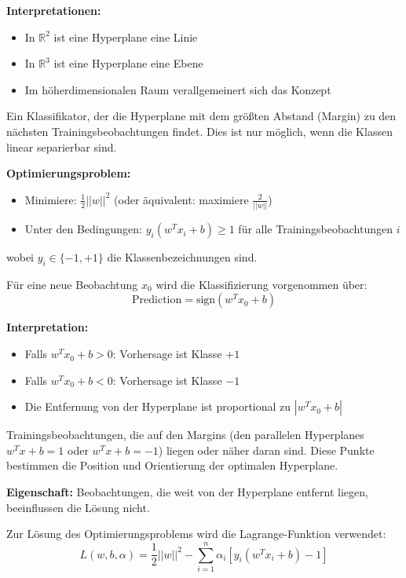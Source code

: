 \textbf{Interpretationen:}
\begin{itemize}[leftmargin=1.5em]
    \item In $\mathbb{R}^2$ ist eine Hyperplane eine Linie
    \item In $\mathbb{R}^3$ ist eine Hyperplane eine Ebene
    \item Im höherdimensionalen Raum verallgemeinert sich das Konzept
\end{itemize}

Ein Klassifikator, der die Hyperplane mit dem größten Abstand (Margin) zu den nächsten Trainingsbeobachtungen findet. Dies ist nur möglich, wenn die Klassen linear separierbar sind.

\textbf{Optimierungsproblem:}
\begin{itemize}[leftmargin=1.5em]
    \item Minimiere: $\frac{1}{2}||w||^2$ (oder äquivalent: maximiere $\frac{2}{||w||}$)
    \item Unter den Bedingungen: $y_i (w^T x_i + b) \geq 1$ für alle Trainingsbeobachtungen $i$
\end{itemize}

wobei $y_i \in \{-1, +1\}$ die Klassenbezeichnungen sind.

Für eine neue Beobachtung $x_0$ wird die Klassifizierung vorgenommen über:
$$\text{Prediction} = \text{sign}(w^T x_0 + b)$$

\textbf{Interpretation:}
\begin{itemize}[leftmargin=1.5em]
    \item Falls $w^T x_0 + b > 0$: Vorhersage ist Klasse $+1$
    \item Falls $w^T x_0 + b < 0$: Vorhersage ist Klasse $-1$
    \item Die Entfernung von der Hyperplane ist proportional zu $|w^T x_0 + b|$
\end{itemize}

Trainingsbeobachtungen, die auf den Margins (den parallelen Hyperplanes $w^T x + b = 1$ oder $w^T x + b = -1$) liegen oder näher daran sind. Diese Punkte bestimmen die Position und Orientierung der optimalen Hyperplane.

\textbf{Eigenschaft:} Beobachtungen, die weit von der Hyperplane entfernt liegen, beeinflussen die Lösung nicht.

Zur Lösung des Optimierungsproblems wird die Lagrange-Funktion verwendet:
$$L(w, b, \alpha) = \frac{1}{2}||w||^2 - \sum_{i=1}^{n} \alpha_i [y_i (w^T x_i + b) - 1]$$

